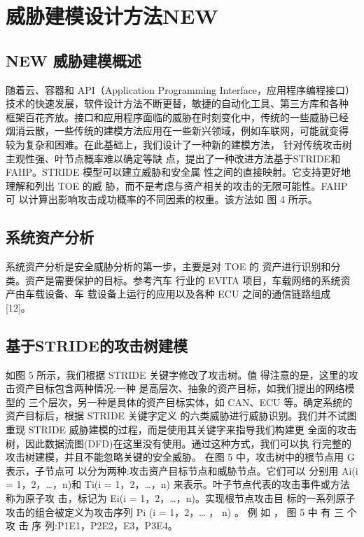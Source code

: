 \chapter{威胁建模设计方法NEW}
\label{ch4}
\section{NEW 威胁建模概述}
随着云、容器和 API（Application Programming Interface，应用程序编程接口）
技术的快速发展，软件设计方法不断更替，敏捷的自动化工具、第三方库和各种
框架百花齐放。接口和应用程序面临的威胁在时刻变化中，传统的一些威胁已经
烟消云散，一些传统的建模方法应用在一些新兴领域，例如车联网，可能就变得
较为复杂和困难。在此基础上，我们设计了一种新的建模方法，
针对传统攻击树主观性强、叶节点概率难以确定等缺
点，提出了一种改进方法基于STRIDE和 FAHP。STRIDE 模型可以建立威胁和安全属
性之间的直接映射。它支持更好地理解和列出 TOE 的威
胁，而不是考虑与资产相关的攻击的无限可能性。FAHP 可
以计算出影响攻击成功概率的不同因素的权重。该方法如
图 4 所示。
\section{系统资产分析}
系统资产分析是安全威胁分析的第一步，主要是对 TOE 的
资产进行识别和分类。资产是需要保护的目标。参考汽车
行业的 EVITA 项目，车载网络的系统资产由车载设备、车
载设备上运行的应用以及各种 ECU 之间的通信链路组成
[12]。
\section{基于STRIDE的攻击树建模}
如图 5 所示，我们根据 STRIDE 关键字修改了攻击树。值
得注意的是，这里的攻击资产目标包含两种情况:一种
是高层次、抽象的资产目标，如我们提出的网络模型的
三个层次，另一种是具体的资产目标实体，如 CAN、ECU
等。确定系统的资产目标后，根据 STRIDE 关键字定义
的六类威胁进行威胁识别。我们并不试图重现 STRIDE
威胁建模的过程，而是使用其关键字来指导我们构建更
全面的攻击树，因此数据流图(DFD)在这里没有使用。通过这种方式，我们可以执
行完整的攻击树建模，并且不能忽略关键的安全威胁。
\newline
在图 5 中，攻击树中的根节点用 G 表示，子节点可
以分为两种:攻击资产目标节点和威胁节点。它们可以
分别用 Ai(i = 1，2，…，n)和 Ti(i = 1，2，…，n)
来表示。叶子节点代表的攻击事件或方法称为原子攻
击，标记为 Ei(i = 1，2，…，n)。实现根节点攻击目
标的一系列原子攻击的组合被定义为攻击序列 Pi (i =
1，2，… ， n) 。 例 如 ， 图 5 中 有 三 个 攻 击 序
列:P1{E1}，P2{E2，E3}，P3{E4}。
